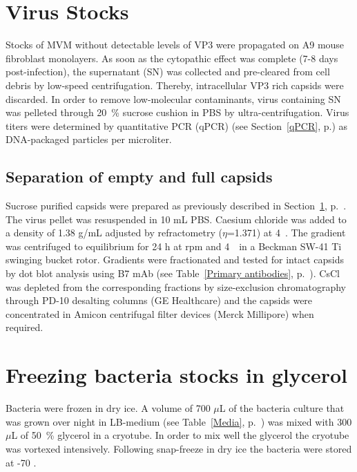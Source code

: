 
\section{Virus Stocks}
\label{Virus Stocks}
Stocks of MVM without detectable levels of VP3 were propagated on A9 mouse fibroblast monolayers. As soon as the cytopathic effect was complete (7-8 days post-infection), the supernatant (SN) was collected and pre-cleared from cell debris by low-speed centrifugation. Thereby, intracellular VP3 rich capsids were discarded. In order to remove low-molecular contaminants, virus containing SN was pelleted through 20~\% sucrose cushion in PBS by ultra-centrifugation. Virus titers were determined by quantitative PCR (qPCR) (see Section~\ref{qPCR}, p.\pageref{qPCR}) as DNA-packaged particles per microliter.   


\subsection{Separation of empty and full capsids}
\label{CsCl}
Sucrose purified capsids were prepared as previously described in Section~\ref{Virus Stocks}, p.~\pageref{Virus Stocks}. The virus pellet was resuspended in 10 mL PBS. Caesium chloride was added to a density of 1.38 g/mL adjusted by refractometry ($\eta$=1.371) at 4~\textcelsius. The gradient was centrifuged to equilibrium for 24 h at  rpm and 4~\textcelsius~in a Beckman SW-41 Ti swinging bucket rotor. Gradients were fractionated and tested for intact capsids by dot blot analysis using B7 mAb (see Table~\ref{Primary antibodies}, p.~\pageref{Primary antibodies}). CsCl was depleted from the corresponding fractions by size-exclusion chromatography through PD-10 desalting columns (GE Healthcare) and the capsids were concentrated in Amicon\textsuperscript{\textregistered} centrifugal filter devices (Merck Millipore) when required.          
   
   


\section{Freezing bacteria stocks in glycerol}
Bacteria were frozen in dry ice. A volume of 700 $\mu$L of the bacteria culture that was grown over night in LB-medium (see Table~\ref{Media}, p.~\pageref{Media}) was mixed with 300 $\mu$L of 50~\% glycerol in a cryotube. In order to mix well the glycerol the cryotube was vortexed intensively. Following snap-freeze in dry ice the bacteria were stored at -70 \textcelsius.


